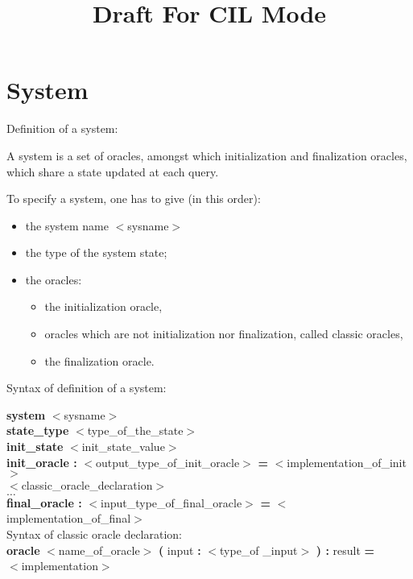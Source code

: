 \documentclass[11pt]{article}
\renewcommand{\textit}[1]{ $<$#1$>$}
\begin{document}

\title{Draft For CIL Mode}
\maketitle

\section{System}

Definition of a system:

A system is a set of oracles, amongst which 
initialization and finalization oracles, which share a
state updated at each query.

To specify a system, one has to give (in this order):
\begin{itemize}
\item the system name \textit{sysname}
\item the type of the system state;
\item the oracles:
  \begin{itemize}
  \item the initialization oracle, 
  \item oracles which are not initialization nor finalization, called
classic oracles,
  \item the finalization oracle.
  \end{itemize}
\end{itemize}

Syntax of definition of a system:

\textbf{system} \textit{sysname} \\
\textbf{state\_type} \textit{type\_of\_the\_state}\\
\textbf{init\_state} \textit{init\_state\_value}\\
\textbf{init\_oracle : } \textit{output\_type\_of\_init\_oracle} 
\textbf{=}
\textit{implementation\_of\_init}\\
\textit{classic\_oracle\_declaration}\\
$\dots$\\
\textbf{final\_oracle : } \textit{input\_type\_of\_final\_oracle} \textbf{=}
\textit{implementation\_of\_final}\\

Syntax of classic oracle declaration:\\
\textbf{oracle } \textit{name\_of\_oracle} \textbf{(} input
\textbf{: }\textit{type\_of \_input} \textbf{) : } result
\textbf{=}\\ \textit{implementation}\\
\end{document}
